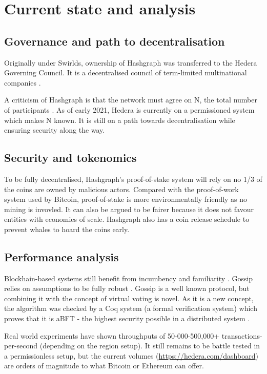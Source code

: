 \section{Current state and analysis}

\subsection{Governance and path to decentralisation}
Originally under Swirlds, ownership of Hashgraph was transferred to the Hedera Governing Council. It is a decentralised council of term-limited multinational companies \cite{baird2018hedera}. 

A criticism of Hashgraph is that the network must agree on N, the total number of participants \cite{kauflin2018}. As of early 2021, Hedera is currently on a permissioned system which makes N known. It is still on a path towards decentralisation while ensuring security along the way.

\subsection{Security and tokenomics}
To be fully decentralised, Hashgraph's proof-of-stake system will rely on no 1/3 of the coins are owned by malicious actors. Compared with the proof-of-work system used by Bitcoin, proof-of-stake is more environmentally friendly as no mining is invovled. It can also be argued to be fairer because it does not favour entities with economies of scale. Hashgraph also has a coin release schedule to prevent whales to hoard the coins early.%

\subsection{Performance analysis}
Blockhain-based systems still benefit from incumbency and familiarity \cite{khariff2018}. Gossip relies on assumptions to be fully robust \cite{alvisi}. Gossip is a well known protocol, but combining it with the concept of virtual voting is novel. As it is a new concept, the algorithm was checked by a Coq system (a formal verification system) which proves that it is aBFT - the highest security possible in a distributed system \cite{coq2018}.

Real world experiments have shown throughputs of 50-000-500,000+ transactions-per-second (depending on the region setup)\cite{baird2018hedera}. It still remains to be battle tested in a permissionless setup, but the current volumes (\url{https://hedera.com/dashboard}) are orders of magnitude to what Bitcoin or Ethereum can offer.

